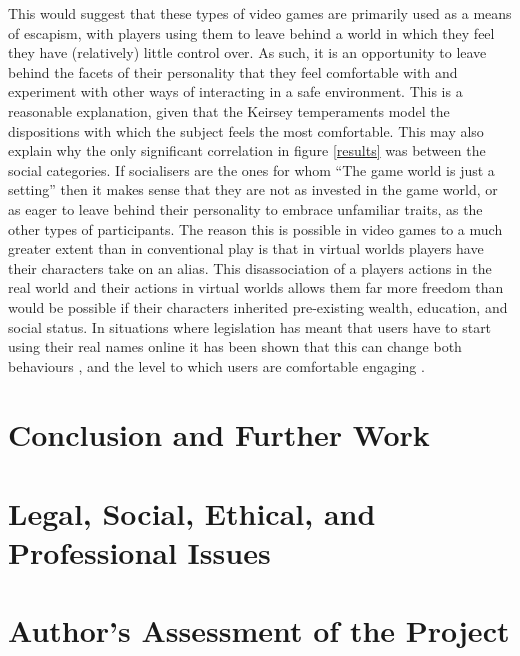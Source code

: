 \documentclass[12pt,a4paper,twoside]{report}
\begin{document}
This would suggest that these types of video games are primarily used as a means of escapism, with players using them to leave behind a world in which they feel they have (relatively) little control over. As such, it is an opportunity to leave behind the facets of their personality that they feel comfortable with and experiment with other ways of interacting in a safe environment. This is a reasonable explanation, given that the Keirsey temperaments model the dispositions with which the subject feels the most comfortable. This may also explain why the only significant correlation in figure \ref{results} was between the social categories. If socialisers are the ones for whom ``The game world is just a setting'' \cite{bartle1996hearts} then it makes sense that they are not as invested in the game world, or as eager to leave behind their personality to embrace unfamiliar traits, as the other types of participants. The reason this is possible in video games to a much greater extent than in conventional play is that in virtual worlds players have their characters take on an alias. This disassociation of a players actions in the real world and their actions in virtual worlds allows them far more freedom than would be possible if their characters inherited pre-existing wealth, education, and social status. In situations where legislation has meant that users have to start using their real names online it has been shown that this can change both behaviours \cite{cho2012empirical}, and the level to which users are comfortable engaging \cite{bellonline}.

\chapter{Conclusion and Further Work}


\chapter{Legal, Social, Ethical, and Professional Issues}
\label{sec:issues}

\chapter{Author's Assessment of the Project}
\end{document}

